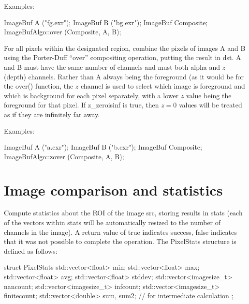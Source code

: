 \smallskip
\noindent Examples:
\begin{code}
    ImageBuf A ("fg.exr");
    ImageBuf B ("bg.exr");
    ImageBuf Composite;
    ImageBufAlgo::over (Composite, A, B);
\end{code}
\apiend


 

For all pixels within the designated region, combine the pixels of
images {\cf A} and {\cf B} using the Porter-Duff ``over'' compositing
operation, putting the result in {\cf dst}.  {\cf A} and {\cf B} must
have the same number of channels and must both alpha and $z$ (depth)
channels. Rather than {\cf A} always being the foreground (as it would
be for the {\cf over()} function, the $z$ channel is used to select
which image is foreground and which is background for each pixel
separately, with a lower $z$ value being the foreground for that pixel.
If {\cf z_zeroisinf} is {\cf true}, then $z=0$ values will be treated
as if they are infinitely far away.

\smallskip
\noindent Examples:
\begin{code}
    ImageBuf A ("a.exr");
    ImageBuf B ("b.exr");
    ImageBuf Composite;
    ImageBufAlgo::zover (Composite, A, B);
\end{code}
\apiend



\section{Image comparison and statistics}
\label{sec:iba:stats}

 

Compute statistics about the ROI of the image {\cf src}, storing results
in {\cf stats} (each of the vectors within {\cf stats} will be
automatically resized to the number of channels in the image).  A return
value of {\cf true} indicates success, {\cf false} indicates that it was
not possible to complete the operation.
 The {\cf PixelStats} structure is defined as follows:
\begin{code}
struct PixelStats {
    std::vector<float> min;
    std::vector<float> max;
    std::vector<float> avg;
    std::vector<float> stddev;
    std::vector<imagesize_t> nancount;
    std::vector<imagesize_t> infcount;
    std::vector<imagesize_t> finitecount;
    std::vector<double> sum, sum2;  // for intermediate calculation
};
\end{code}

